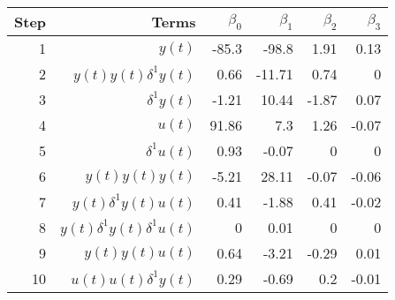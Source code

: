 \begin{tabular}{rrrrrr}
Step & Terms & $\beta_{0}$ & $\beta_{1}$ & $\beta_{2}$ & $\beta_{3}$ \\ 
\hline 
1 & $y(t)$ & -85.3 & -98.8 & 1.91 & 0.13 \\ 
2 & $y(t)y(t)\delta^1 y(t)$ & 0.66 & -11.71 & 0.74 & 0 \\ 
3 & $\delta^1 y(t)$ & -1.21 & 10.44 & -1.87 & 0.07 \\ 
4 & $u(t)$ & 91.86 & 7.3 & 1.26 & -0.07 \\ 
5 & $\delta^1 u(t)$ & 0.93 & -0.07 & 0 & 0 \\ 
6 & $y(t)y(t)y(t)$ & -5.21 & 28.11 & -0.07 & -0.06 \\ 
7 & $y(t)\delta^1 y(t)u(t)$ & 0.41 & -1.88 & 0.41 & -0.02 \\ 
8 & $y(t)\delta^1 y(t)\delta^1 u(t)$ & 0 & 0.01 & 0 & 0 \\ 
9 & $y(t)y(t)u(t)$ & 0.64 & -3.21 & -0.29 & 0.01 \\ 
10 & $u(t)u(t)\delta^1 y(t)$ & 0.29 & -0.69 & 0.2 & -0.01 \\ 
\hline 
\end{tabular}